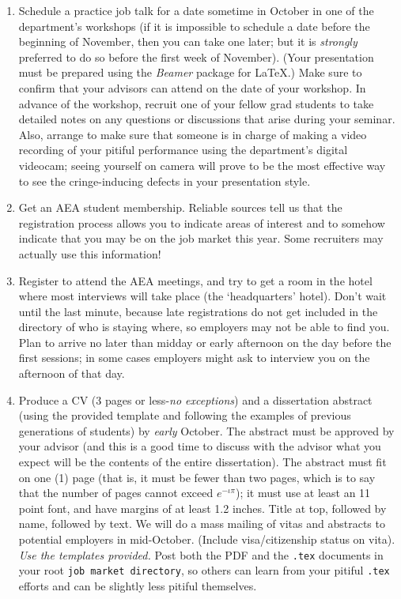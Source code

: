 \documentclass{econtex}
\begin{document}
\begin{enumerate}
\item Schedule a practice job talk for a date sometime in October in
  one of the department's workshops (if it is impossible to schedule a
  date before the beginning of November, then you can take one later;
  but it is {\it strongly} preferred to do so before the first week of
  November).  (Your presentation must be prepared using the {\it
    Beamer} package for {\LaTeX}.)  Make sure to confirm that your
  advisors can attend on the date of your workshop.  In advance of the
  workshop, recruit one of your fellow grad students to take detailed
  notes on any questions or discussions that arise during your
  seminar.  Also, arrange to make sure that someone is in charge of
  making a video recording of your pitiful performance using the
  department's digital videocam; seeing yourself on camera will prove
  to be the most effective way to see the cringe-inducing defects in
  your presentation style.
  
\item Get an AEA student membership.  Reliable sources tell us that
  the registration process allows you to indicate areas of interest
  and to somehow indicate that you may be on the job market this year.
  Some recruiters may actually use this information!
  
\item Register to attend the AEA meetings, and try to get a room in
  the hotel where most interviews will take place (the `headquarters'
  hotel).  Don't wait until the last minute, because late
  registrations do not get included in the directory of who is staying
  where, so employers may not be able to find you.  Plan to arrive no
  later than midday or early afternoon on the day before the first
  sessions; in some cases employers might ask to interview you on the
  afternoon of that day.
  
\item Produce a CV (3 pages or less-{\it no exceptions}) and a
  dissertation abstract (using the provided template and following the
  examples of previous generations of students) by {\it early} October.  The
  abstract must be approved by your advisor (and this is a good time
  to discuss with the advisor what you expect will be the contents of
  the entire dissertation).  The abstract must fit on one (1) page
  (that is, it must be fewer than two pages, which is to say that the
  number of pages cannot exceed $e^{-\iota \pi}$); it must use at
  least an 11 point font, and have margins of at least 1.2 inches.  Title at
  top, followed by name, followed by text.  We will do a mass mailing
  of vitas and abstracts to potential employers in mid-October.
  (Include visa/citizenship status on vita).  {\it Use the templates
    provided.}  Post both the PDF and the \texttt{.tex} documents in
  your root \texttt{job market directory}, so others can learn from your pitiful
  \texttt{.tex} efforts and can be slightly less pitiful themselves.


\end{enumerate}
\end{document}

